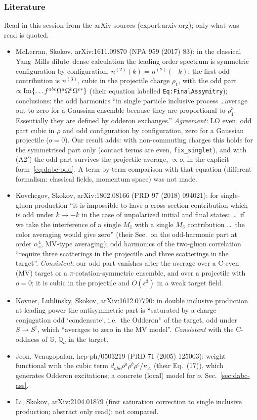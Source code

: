 \documentclass[10pt]{article}
\def\mf#1{\mathbb{#1}}
\begin{document}
\subsubsection{Literature}\label{sec:dabc-lit}
\noindent Read in this session from the arXiv sources (export.arxiv.org); only what was read is quoted.
\begin{itemize}
\item McLerran, Skokov, arXiv:1611.09870 (NPA 959 (2017) 83): in the classical Yang--Mills dilute--dense calculation the leading order spectrum is symmetric configuration by configuration, $n^{(2)}(k)=n^{(2)}(-k)$; the first odd contribution is $n^{(3)}$, cubic in the projectile charge $\rho_{1}$, with the odd part $\propto{\rm Im}\{\dots f^{abc}\Omega^{a}\Omega^{b}\Omega^{c*}\}$ (their equation labelled \texttt{Eq:FinalAssymitry}); conclusions: the odd harmonics ``in single particle inclusive process \dots average out to zero for a Gaussian ensemble because they are proportional to $\rho_{1}^{3}$. Essentially they are defined by odderon exchanges.'' \emph{Agreement:} LO even, odd part cubic in $\rho$ and odd configuration by configuration, zero for a Gaussian projectile ($o=0$). Our result adds: with non-commuting charges this holds for the symmetrised part only (contact terms are even, \texttt{fix\_singlet}), and with (A2$'$) the odd part survives the projectile average, $\propto o$, in the explicit form~\eqref{eq:dabc-odd}. A term-by-term comparison with that equation (different formalism: classical fields, momentum space) was not made.
\item Kovchegov, Skokov, arXiv:1802.08166 (PRD 97 (2018) 094021): for single-gluon production ``it is impossible to have a cross section contribution which is odd under $k\to-k$ in the case of unpolarized initial and final states: \dots\ if we take the interference of a single $M_{1}$ with a single $M_{3}$ contribution \dots\ the color averaging would give zero'' (their Sec.\ on the odd-harmonic part at order $\alpha_{s}^{4}$, MV-type averaging); odd harmonics of the two-gluon correlation ``require three scatterings in the projectile and three scatterings in the target''. \emph{Consistent}: our odd part vanishes after the average over a C-even (MV) target or a $\pi$-rotation-symmetric ensemble, and over a projectile with $o=0$; it is cubic in the projectile and $O(\epsilon^{3})$ in a weak target field.
\item Kovner, Lublinsky, Skokov, arXiv:1612.07790: in double inclusive production at leading power the antisymmetric part is ``saturated by a charge conjugation odd `condensate', i.e.\ the Odderon'' of the target, odd under $S\to S^{\dagger}$, which ``averages to zero in the MV model''. \emph{Consistent} with the C-oddness of $\mf{G}$, $\mf{Q}_{d}$ in the target.
\item Jeon, Venugopalan, hep-ph/0503219 (PRD 71 (2005) 125003): weight functional with the cubic term $d_{abc}\rho^{a}\rho^{b}\rho^{c}/\kappa_{A}$ (their Eq.~(17)), which generates Odderon excitations; a concrete (local) model for $o$, Sec.~\ref{sec:dabc-ass}.
\item Li, Skokov, arXiv:2104.01879 (first saturation correction to single inclusive production; abstract only read): not compared.
\end{itemize}
\end{document}
